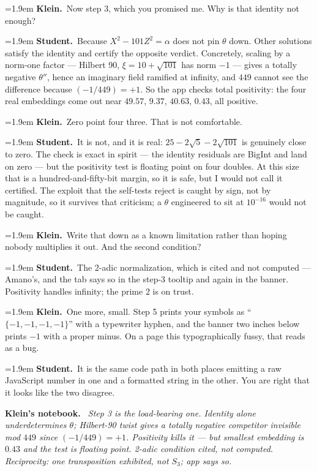 \documentclass[11pt]{article}
\newcommand{\Stu}[1]{\par\smallskip\noindent\hangindent=1.9em\hangafter=1%
  \textcolor{stucol}{\textbf{Student.}}~#1\par}
\newcommand{\Kle}[1]{\par\smallskip\noindent\hangindent=1.9em\hangafter=1%
  \textcolor{klecol}{\textbf{Klein.}}~#1\par}
\newenvironment{knote}%
  {\begin{snugshade}\small\noindent\textbf{\textcolor{klecol}{Klein's notebook.}}\itshape\ }%
  {\end{snugshade}}
\begin{document}
\Kle{Now step 3, which you promised me. Why is that identity not enough?}

\Stu{Because $X^2 - 101Z^2 = \alpha$ does not pin $\theta$ down. Other solutions satisfy the identity and certify the opposite verdict. Concretely, scaling by a norm-one factor --- Hilbert 90, $\xi = 10 + \sqrt{101}$ has norm $-1$ --- gives a totally negative $\theta''$, hence an imaginary field ramified at infinity, and $449$ cannot see the difference because $(-1/449) = +1$. So the app checks total positivity: the four real embeddings come out near $49.57$, $9.37$, $40.63$, $0.43$, all positive.}

\Kle{Zero point four three. That is not comfortable.}

\Stu{It is not, and it is real: $25 - 2\sqrt{5} - 2\sqrt{101}$ is genuinely close to zero. The check is exact in spirit --- the identity residuals are BigInt and land on zero --- but the positivity test is floating point on four doubles. At this size that is a hundred-and-fifty-bit margin, so it is safe, but I would not call it certified. The exploit that the self-tests reject is caught by sign, not by magnitude, so it survives that criticism; a $\theta$ engineered to sit at $10^{-16}$ would not be caught.}

\Kle{Write that down as a known limitation rather than hoping nobody multiplies it out. And the second condition?}

\Stu{The 2-adic normalization, which is cited and not computed --- Amano's, and the tab says so in the step-3 tooltip and again in the banner. Positivity handles infinity; the prime $2$ is on trust.}

\Kle{One more, small. Step 5 prints your symbols as ``$\{-1, -1, -1, -1\}$'' with a typewriter hyphen, and the banner two inches below prints $-1$ with a proper minus. On a page this typographically fussy, that reads as a bug.}

\Stu{It is the same code path in both places emitting a raw JavaScript number in one and a formatted string in the other. You are right that it looks like the two disagree.}

\begin{knote}
Step 3 is the load-bearing one. Identity alone underdetermines $\theta$; Hilbert-90 twist gives a totally negative competitor invisible mod $449$ since $(-1/449) = +1$. Positivity kills it --- but smallest embedding is $0.43$ and the test is floating point. 2-adic condition cited, not computed. Reciprocity: one transposition exhibited, not $S_3$; app says so.
\end{knote}
\end{document}
